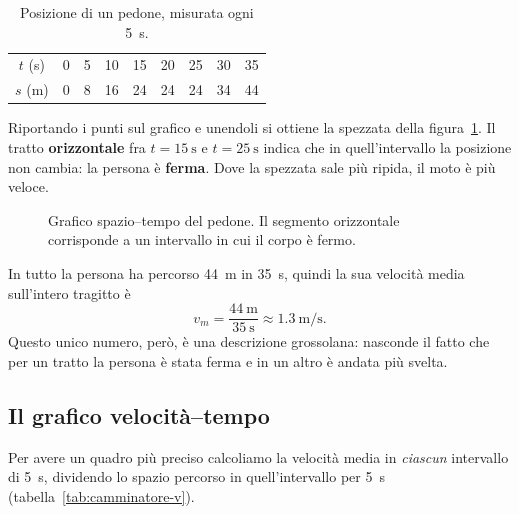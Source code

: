 \begin{table}[!htbp]
    \centering
    \begin{tabular}{c|cccccccc}
        \toprule
        $t$ (s) & 0 & 5 & 10 & 15 & 20 & 25 & 30 & 35 \\
        $s$ (m) & 0 & 8 & 16 & 24 & 24 & 24 & 34 & 44 \\
        \bottomrule
    \end{tabular}
    \caption{Posizione di un pedone, misurata ogni \SI{5}{\second}.}
    \label{tab:camminatore}
\end{table}

Riportando i punti sul grafico e unendoli si ottiene la spezzata della figura~\ref{fig:st-camminatore}. Il tratto \textbf{orizzontale} fra $t = \SI{15}{\second}$ e $t = \SI{25}{\second}$ indica che in quell'intervallo la posizione non cambia: la persona è \textbf{ferma}. Dove la spezzata sale più ripida, il moto è più veloce.

\begin{figure}[!htbp]
    \centering
    \caption{Grafico spazio--tempo del pedone. Il segmento orizzontale corrisponde a un intervallo in cui il corpo è fermo.}
    \label{fig:st-camminatore}
\end{figure}

In tutto la persona ha percorso \SI{44}{\metre} in \SI{35}{\second}, quindi la sua velocità media sull'intero tragitto è
\[ v_m = \frac{\SI{44}{\metre}}{\SI{35}{\second}} \approx \SI{1,3}{\metre\per\second}. \]
Questo unico numero, però, è una descrizione grossolana: nasconde il fatto che per un tratto la persona è stata ferma e in un altro è andata più svelta.

\subsection{Il grafico velocità--tempo}
Per avere un quadro più preciso calcoliamo la velocità media in \emph{ciascun} intervallo di \SI{5}{\second}, dividendo lo spazio percorso in quell'intervallo per \SI{5}{\second} (tabella~\ref{tab:camminatore-v}).

